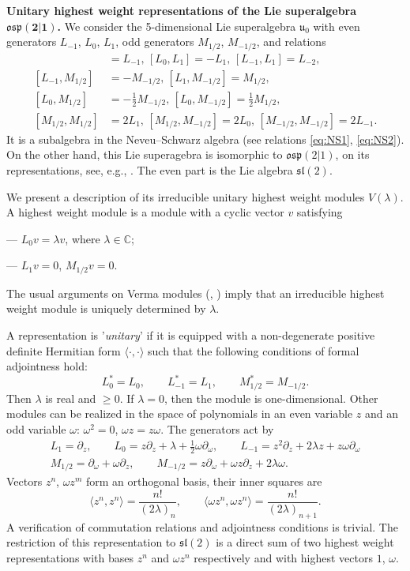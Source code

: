 \documentclass[]{amsart}
\newcounter{sec}
\newcounter{punct}[sec]
\def\punct{\refstepcounter{punct}{\arabic{sec}.\arabic{punct}.  }}
\def\ge{\geqslant}
\def\la{\langle}
\def\ra{\rangle}
\def\frl{\mathfrak l}
\def\frs{\mathfrak s}
\def\fru{\mathfrak u}
\def\C {{\mathbb C }}
\def\sm{\smallskip}
\def\osp{\mathfrak{osp}}
\begin{document}
{\bf\punct Unitary highest weight representations of the Lie superalgebra 
$\boldsymbol{\osp(2|1)}$.} We consider the 5-dimensional Lie superalgebra $\fru_0$  
with even
generators
$L_{-1}$, $L_0$, $L_1$, odd generators $M_{1/2}$, $M_{-1/2}$, and relations
\begin{align}
 [L_0,L_{-1}]&=L_{-1},\, [L_0,L_1]=-L_1, \, [L_{-1},L_1]=L_{-2},
 \label{eq:osp21-1}
 \\
 [L_{-1}, M_{1/2}]&=-M_{-1/2}, \, [L_1,M_{-1/2}]=M_{1/2}, \\
 [L_0,M_{1/2}]&=-\tfrac12 M_{-1/2},\, [L_0,M_{-1/2}]=\tfrac 12 M_{1/2},\\
 [M_{1/2},M_{1/2}]&=2L_1,\, [M_{1/2},M_{-1/2}]=2L_0,\, [M_{-1/2},M_{-1/2}]=2L_{-1}.
 \label{eq:osp21-4}
\end{align}
It is a subalgebra in the Neveu--Schwarz algebra (see relations \eqref{eq:NS1}, \eqref{eq:NS2}). On the other hand, 
this Lie superagebra is isomorphic to  $\osp(2|1)$, on its representations, see, e.g., \cite{FH}. The even part is the Lie algebra $\frs\frl(2)$.

We present a description of its irreducible unitary highest
weight modules $V(\lambda)$. A highest weight module  is a  module with a cyclic vector $v$ satisfying 

\sm

--- $L_0 v=\lambda v$, where $\lambda\in\C$;

\sm

--- $L_{1} v=0$, $M_{1/2} v=0$.

\sm

The usual arguments on Verma modules (\cite{Dix}, \cite{Mus}) imply that an irreducible highest weight module is uniquely determined by $\lambda$.

A representation is '{\it unitary}' if it is equipped with a non-degenerate positive definite Hermitian form
$\la\cdot,\cdot\ra$ such that the following conditions of formal adjointness hold:
$$L_0^*=L_0,\qquad  L_{-1}^*=L_1, \qquad M^*_{1/2}=M_{-1/2}.$$
 Then $\lambda$ is real and $\ge 0$. If $\lambda=0$, then the module is one-dimensional. Other modules can be realized
in the space of polynomials in an even variable $z$ and an odd variable $\omega$: $\omega^2=0$, $\omega z=z\omega$. The generators act by
\begin{align*}
 L_1=\partial_z,\qquad L_0=z\partial_z+\lambda+ \tfrac12 \omega\partial_\omega, \qquad L_{-1} = z^2\partial_z+2\lambda z+z\omega\partial_\omega
 \\
 M_{1/2}=\partial_\omega +\omega \partial_z,\qquad M_{-1/2}=z\partial_\omega +\omega z\partial_z+2\lambda\omega.
\end{align*}
Vectors $z^n$, $\omega z^m$ form an orthogonal basis, their inner squares are
\begin{equation}
 \la z^n, z^n\ra=\frac{n!}{(2\lambda)_n}, \qquad \la \omega z^n, \omega z^n\ra= \frac{n!}{(2\lambda)_{n+1}}.
 \label{eq:squares}
\end{equation}
A verification of commutation relations and adjointness conditions is trivial. The restriction
of this representation to $\frs\frl(2)$ is a direct sum of two highest weight representations with bases $z^n$ and $\omega z^n$ 
respectively and with 
 highest vectors $1$, $\omega$.
 
\end{document}
